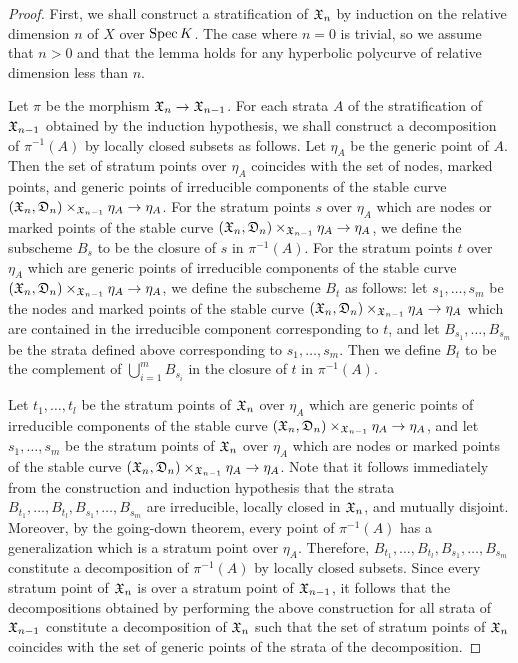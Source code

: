 \begin{proof}
  First, we shall construct a stratification of $\mathfrak{X}_n$ by induction on the relative dimension $n$ of $X$ over $\mathrm{Spec} \, K$. The case where $n = 0$ is trivial, so we assume that $n > 0$ and that the lemma holds for any hyperbolic polycurve of relative dimension less than $n$.

  Let $\pi$ be the morphism $\mathfrak{X}_n \to \mathfrak{X}_{n - 1}$. For each strata $A$ of the stratification of $\mathfrak{X}_{n - 1}$ obtained by the induction hypothesis, we shall construct a decomposition of $\pi^{-1}(A)$ by locally closed subsets as follows. Let $\eta_A$ be the generic point of $A$. Then the set of stratum points over $\eta_A$ coincides with the set of nodes, marked points, and generic points of irreducible components of the stable curve $(\mathfrak{X}_n, \mathfrak{D}_n) \times_{\mathfrak{X}_{n - 1}} \eta_A \to \eta_A$. For the stratum points $s$ over $\eta_A$ which are nodes or marked points of the stable curve $(\mathfrak{X}_n, \mathfrak{D}_n) \times_{\mathfrak{X}_{n - 1}} \eta_A \to \eta_A$, we define the subscheme $B_s$ to be the closure of $s$ in $\pi^{-1}(A)$. For the stratum points $t$ over $\eta_A$ which are generic points of irreducible components of the stable curve $(\mathfrak{X}_n, \mathfrak{D}_n) \times_{\mathfrak{X}_{n - 1}} \eta_A \to \eta_A$, we define the subscheme $B_t$ as follows: let $s_1, \ldots, s_m$ be the nodes and marked points of the stable curve $(\mathfrak{X}_n, \mathfrak{D}_n) \times_{\mathfrak{X}_{n - 1}} \eta_A \to \eta_A$ which are contained in the irreducible component corresponding to $t$, and let $B_{s_1}, \ldots, B_{s_m}$ be the strata defined above corresponding to $s_1, \ldots, s_m$. Then we define $B_t$ to be the complement of $\bigcup_{i = 1}^m B_{s_i}$ in the closure of $t$ in $\pi^{-1}(A)$.

  Let $t_1, \ldots, t_l$ be the stratum points of $\mathfrak{X}_n$ over $\eta_A$ which are generic points of irreducible components of the stable curve $(\mathfrak{X}_n, \mathfrak{D}_n) \times_{\mathfrak{X}_{n - 1}} \eta_A \to \eta_A$, and let $s_1, \ldots, s_m$ be the stratum points of $\mathfrak{X}_n$ over $\eta_A$ which are nodes or marked points of the stable curve $(\mathfrak{X}_n, \mathfrak{D}_n) \times_{\mathfrak{X}_{n - 1}} \eta_A \to \eta_A$. Note that it follows immediately from the construction and induction hypothesis that the strata $B_{t_1}, \ldots, B_{t_l}, B_{s_1}, \ldots, B_{s_m}$ are irreducible, locally closed in $\mathfrak{X}_n$, and mutually disjoint. Moreover, by the going-down theorem, every point of $\pi^{-1}(A)$ has a generalization which is a stratum point over $\eta_A$. Therefore, $B_{t_1}, \ldots, B_{t_l}, B_{s_1}, \ldots, B_{s_m}$ constitute a decomposition of $\pi^{-1}(A)$ by locally closed subsets. Since every stratum point of $\mathfrak{X}_n$ is over a stratum point of $\mathfrak{X}_{n - 1}$, it follows that the decompositions obtained by performing the above construction for all strata of $\mathfrak{X}_{n - 1}$ constitute a decomposition of $\mathfrak{X}_n$ such that the set of stratum points of $\mathfrak{X}_n$ coincides with the set of generic points of the strata of the decomposition.


\end{proof}
